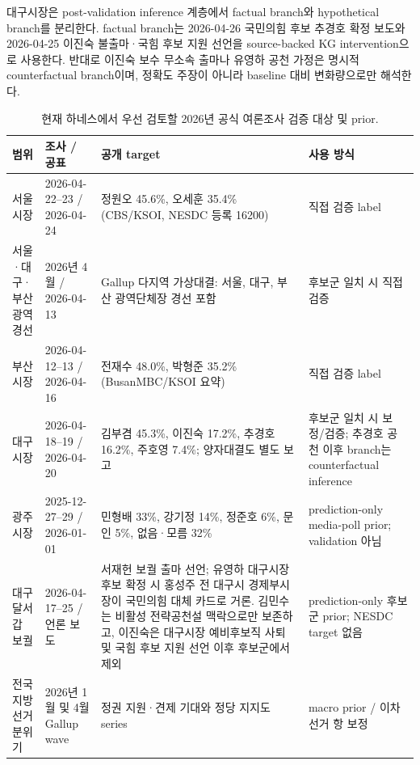\documentclass[11pt]{article}
\begin{document}
대구시장은 post-validation inference 계층에서 factual branch와 hypothetical branch를 분리한다. factual branch는 2026-04-26 국민의힘 후보 추경호 확정 보도와 2026-04-25 이진숙 불출마·국힘 후보 지원 선언을 source-backed KG intervention으로 사용한다. 반대로 이진숙 보수 무소속 출마나 유영하 공천 가정은 명시적 counterfactual branch이며, 정확도 주장이 아니라 baseline 대비 변화량으로만 해석한다.

\begin{table}[h]
\centering
\caption{현재 하네스에서 우선 검토할 2026년 공식 여론조사 검증 대상 및 prior.}
\label{tab:official-poll-targets}
\small
\setlength{\tabcolsep}{4pt}
\begin{tabular}{p{}p{}p{}p{}}
\toprule
범위 & 조사 / 공표 & 공개 target & 사용 방식 \\
\midrule
서울시장 & 2026-04-22--23 / 2026-04-24 & 정원오 45.6\%, 오세훈 35.4\% (CBS/KSOI, NESDC 등록 16200) & 직접 검증 label \\
서울·대구·부산 광역 경선 & 2026년 4월 / 2026-04-13 & Gallup 다지역 가상대결: 서울, 대구, 부산 광역단체장 경선 포함 & 후보군 일치 시 직접 검증 \\
부산시장 & 2026-04-12--13 / 2026-04-16 & 전재수 48.0\%, 박형준 35.2\% (BusanMBC/KSOI 요약) & 직접 검증 label \\
대구시장 & 2026-04-18--19 / 2026-04-20 & 김부겸 45.3\%, 이진숙 17.2\%, 추경호 16.2\%, 주호영 7.4\%; 양자대결도 별도 보고 & 후보군 일치 시 보정/검증; 추경호 공천 이후 branch는 counterfactual inference \\
광주시장 & 2025-12-27--29 / 2026-01-01 & 민형배 33\%, 강기정 14\%, 정준호 6\%, 문인 5\%, 없음·모름 32\% & prediction-only media-poll prior; validation 아님 \\
대구 달서갑 보궐 & 2026-04-17--25 / 언론 보도 & 서재헌 보궐 출마 선언; 유영하 대구시장 후보 확정 시 홍성주 전 대구시 경제부시장이 국민의힘 대체 카드로 거론. 김민수는 비활성 전략공천설 맥락으로만 보존하고, 이진숙은 대구시장 예비후보직 사퇴 및 국힘 후보 지원 선언 이후 후보군에서 제외 & prediction-only 후보군 prior; NESDC target 없음 \\
전국 지방선거 분위기 & 2026년 1월 및 4월 Gallup wave & 정권 지원·견제 기대와 정당 지지도 series & macro prior / 이차 선거 항 보정 \\
\bottomrule
\end{tabular}
\end{table}
\end{document}
